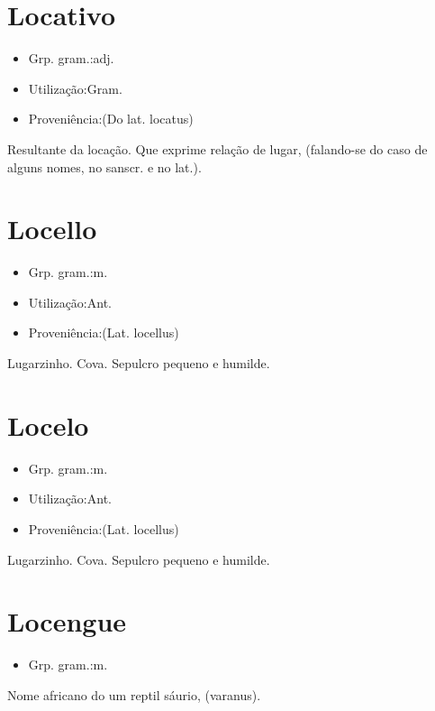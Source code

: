 \section{Locativo}
\begin{itemize}
\item {Grp. gram.:adj.}
\end{itemize}
\begin{itemize}
\item {Utilização:Gram.}
\end{itemize}
\begin{itemize}
\item {Proveniência:(Do lat. \textunderscore locatus\textunderscore )}
\end{itemize}
Resultante da locação.
Que exprime relação de lugar, (falando-se do caso de alguns nomes, no sanscr. e no lat.).
\section{Locello}
\begin{itemize}
\item {Grp. gram.:m.}
\end{itemize}
\begin{itemize}
\item {Utilização:Ant.}
\end{itemize}
\begin{itemize}
\item {Proveniência:(Lat. \textunderscore locellus\textunderscore )}
\end{itemize}
Lugarzinho.
Cova.
Sepulcro pequeno e humilde.
\section{Locelo}
\begin{itemize}
\item {Grp. gram.:m.}
\end{itemize}
\begin{itemize}
\item {Utilização:Ant.}
\end{itemize}
\begin{itemize}
\item {Proveniência:(Lat. \textunderscore locellus\textunderscore )}
\end{itemize}
Lugarzinho.
Cova.
Sepulcro pequeno e humilde.
\section{Locengue}
\begin{itemize}
\item {Grp. gram.:m.}
\end{itemize}
Nome africano do um reptil sáurio, (\textunderscore varanus\textunderscore ).
